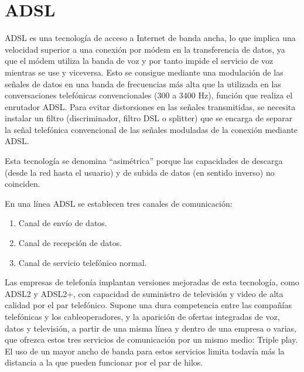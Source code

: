 \documentclass{report}
\begin{document}
\section*{ADSL}
ADSL es una tecnología de acceso a Internet de banda ancha, lo que implica una velocidad superior a una conexión por módem en la transferencia de datos, ya que el módem utiliza la banda de voz y por tanto impide el servicio de voz mientras se use y viceversa. Esto se consigue mediante una modulación de las señales de datos en una banda de frecuencias más alta que la utilizada en las conversaciones telefónicas convencionales (300 a 3400 Hz), función que realiza el enrutador ADSL. Para evitar distorsiones en las señales transmitidas, se necesita instalar un filtro (discriminador, filtro DSL o splitter) que se encarga de separar la señal telefónica convencional de las señales moduladas de la conexión mediante ADSL.\par
Esta tecnología se denomina ``asimétrica'' porque las capacidades de descarga (desde la red hasta el usuario) y de subida de datos (en sentido inverso) no coinciden.\par
En una línea ADSL se establecen tres canales de comunicación:
\begin{enumerate}
\item Canal de envío de datos.
\item Canal de recepción de datos.
\item Canal de servicio telefónico normal.
\end{enumerate} \par
Las empresas de telefonía implantan versiones mejoradas de esta tecnología, como ADSL2 y ADSL2+, con capacidad de suministro de televisión y video de alta calidad por el par telefónico. Supone una dura competencia entre las compañías telefónicas y los cableoperadores, y la aparición de ofertas integradas de voz, datos y televisión, a partir de una misma línea y dentro de una empresa o varias, que ofrezca estos tres servicios de comunicación por un mismo medio: Triple play. El uso de un mayor ancho de banda para estos servicios limita todavía más la distancia a la que pueden funcionar por el par de hilos.
\newpage
\end{document}
